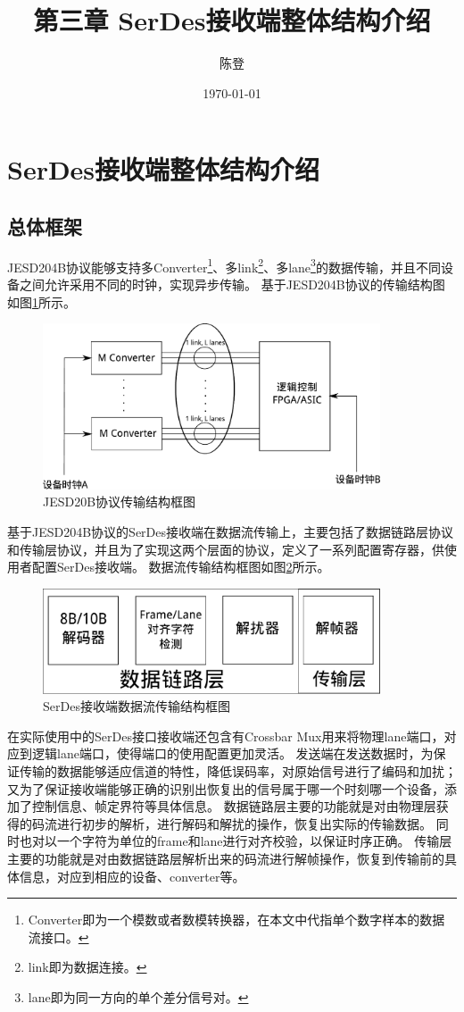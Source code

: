 \documentclass[UTF8]{ctexart}
\title{第三章 SerDes接收端整体结构介绍}
\author{陈登}
\date{\today}
\begin{document}
\section{SerDes接收端整体结构介绍}

\subsection{总体框架}

JESD204B协议能够支持多Converter\footnote{Converter即为一个模数或者数模转换器，在本文中代指单个数字样本的数据流接口。}、多link\footnote{link即为数据连接。}、多lane\footnote{lane即为同一方向的单个差分信号对。}的数据传输，并且不同设备之间允许采用不同的时钟，实现异步传输。
基于JESD204B协议的传输结构图如图\ref{fig:jesd204b_stuct}所示。

\begin{figure}[H]
\centering
\includegraphics[width=10cm]{./img/jesd204b_stuct.pdf}
\caption{JESD20B协议传输结构框图}
\label{fig:jesd204b_stuct}
\end{figure}

基于JESD204B协议的SerDes接收端在数据流传输上，主要包括了数据链路层协议和传输层协议，并且为了实现这两个层面的协议，定义了一系列配置寄存器，供使用者配置SerDes接收端。
数据流传输结构框图如图\ref{fig:serdes_sturct_link_transport_layer}所示。

\begin{figure}[H]
\centering
\includegraphics[width=10cm]{./img/serdes_sturct_link_transport_layer.pdf}
\caption{SerDes接收端数据流传输结构框图}
\label{fig:serdes_sturct_link_transport_layer}
\end{figure}

在实际使用中的SerDes接口接收端还包含有Crossbar Mux用来将物理lane端口，对应到逻辑lane端口，使得端口的使用配置更加灵活。
发送端在发送数据时，为保证传输的数据能够适应信道的特性，降低误码率，对原始信号进行了编码和加扰；又为了保证接收端能够正确的识别出恢复出的信号属于哪一个时刻哪一个设备，添加了控制信息、帧定界符等具体信息。
数据链路层主要的功能就是对由物理层获得的码流进行初步的解析，进行解码和解扰的操作，恢复出实际的传输数据。
同时也对以一个字符为单位的frame和lane进行对齐校验，以保证时序正确。
传输层主要的功能就是对由数据链路层解析出来的码流进行解帧操作，恢复到传输前的具体信息，对应到相应的设备、converter等。
\end{document}
